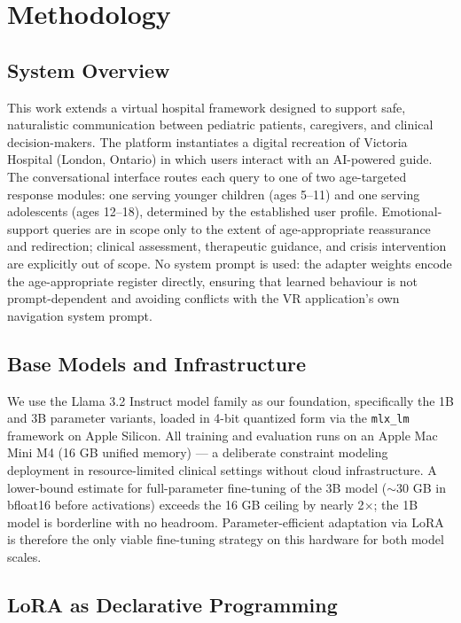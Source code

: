 \documentclass[journal]{IEEEtai}
\begin{document}
\section{Methodology}\label{sec:methodology}

\subsection{System Overview}

This work extends a virtual hospital framework designed to support safe, naturalistic communication between pediatric patients, caregivers, and clinical decision-makers. The platform instantiates a digital recreation of Victoria Hospital (London, Ontario) in which users interact with an AI-powered guide. The conversational interface routes each query to one of two age-targeted response modules: one serving younger children (ages 5--11) and one serving adolescents (ages 12--18), determined by the established user profile. Emotional-support queries are in scope only to the extent of age-appropriate reassurance and redirection; clinical assessment, therapeutic guidance, and crisis intervention are explicitly out of scope. No system prompt is used: the adapter weights encode the age-appropriate register directly, ensuring that learned behaviour is not prompt-dependent and avoiding conflicts with the VR application's own navigation system prompt.

\subsection{Base Models and Infrastructure}

We use the Llama 3.2 Instruct model family \cite{dubey2024llama3} as our foundation, specifically the 1B and 3B parameter variants, loaded in 4-bit quantized form via the \texttt{mlx\_lm} framework \cite{apple2023mlx} on Apple Silicon. All training and evaluation runs on an Apple Mac Mini M4 (16 GB unified memory) --- a deliberate constraint modeling deployment in resource-limited clinical settings without cloud infrastructure. A lower-bound estimate for full-parameter fine-tuning of the 3B model ($\sim$30 GB in bfloat16 before activations) exceeds the 16 GB ceiling by nearly 2$\times$; the 1B model is borderline with no headroom. Parameter-efficient adaptation via LoRA is therefore the only viable fine-tuning strategy on this hardware for both model scales.

\subsection{LoRA as Declarative Programming}
\end{document}
